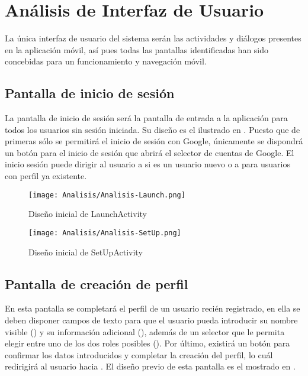 \chapter{Análisis de Interfaz de Usuario}
\label{ch:analisis_interfaz_usuario}

La única interfaz de usuario del sistema serán las actividades y diálogos presentes en la aplicación móvil, así pues todas las pantallas identificadas han sido concebidas para un funcionamiento y navegación móvil.

\section{Pantalla de inicio de sesión}

La pantalla de inicio de sesión será la pantalla de entrada a la aplicación para todos los usuarios sin sesión iniciada. Su diseño es el ilustrado en . Puesto que de primeras sólo se permitirá el inicio de sesión con Google, únicamente se dispondrá un botón para el inicio de sesión que abrirá el selector de cuentas de Google. El inicio sesión puede dirigir al usuario a  si es un usuario nuevo o a  para usuarios con perfil ya existente.

\begin{figure}[H]
    \centering
    \begin{minipage}{0.45\textwidth}
        \centering
        \texttt{[image: Analisis/Analisis-Launch.png]}
        \caption{Diseño inicial de LaunchActivity}
        \label{fig:ui:launch}
    \end{minipage}\hfill
    \begin{minipage}{0.45\textwidth}
        \centering
        \texttt{[image: Analisis/Analisis-SetUp.png]}
        \caption{Diseño inicial de SetUpActivity}
        \label{fig:ui:set_up}
    \end{minipage}
\end{figure}

\section{Pantalla de creación de perfil}
\label{sec:pantalla_creacion_perfil}

En esta pantalla se completará el perfil de un usuario recién registrado, en ella se deben disponer campos de texto para que el usuario pueda introducir su nombre visible () y su información adicional (), además de un selector que le permita elegir entre uno de los dos roles posibles (). Por último, existirá un botón para confirmar los datos introducidos y completar la creación del perfil, lo cuál redirigirá al usuario hacia . El diseño previo de esta pantalla es el mostrado en .

